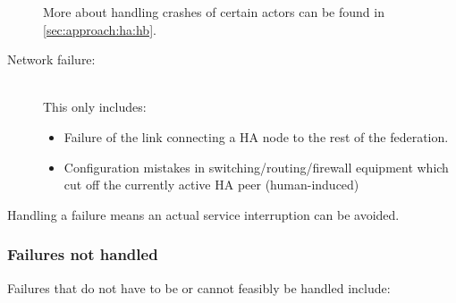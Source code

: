 \begin{description}
		More about handling crashes of certain actors can be found in
		\autoref{sec:approach:ha:hb}.

	\item [Network failure:] \hfill\\
		This only includes:
		\begin{itemize}
			\item Failure of the link connecting a HA node to the
				rest of the federation.
			\item Configuration mistakes in
				switching/routing/firewall equipment which cut
				off the currently active HA peer (human-induced)
		\end{itemize}
\end{description}

Handling a failure means an actual service interruption can be avoided.

\subsubsection{Failures not handled}
Failures that do not have to be or cannot feasibly be handled include:


